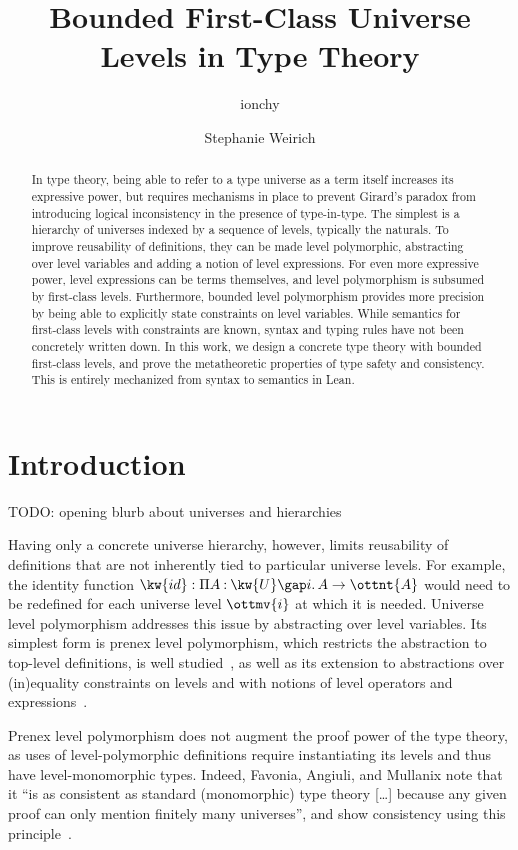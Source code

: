 \documentclass[a4paper,UKenglish,cleveref,autoref,thm-restate]{lipics-v2021}
\title{Bounded First-Class Universe Levels \titlebreak in Type Theory}
\author{ionchy}
  {University of Pennsylvania, Philadelphia, USA}
  {jcxz@seas.upenn.edu}
  {0000-0003-0830-3180}
  {}
\author{Stephanie Weirich}
  {University of Pennsylvania, Philadelphia, USA}
  {sweirich@seas.upenn.edu}
  {0000-0002-6756-9168}
  {}
\newcommand{\citep}[1]{\cite{#1}}
\begin{document}
\maketitle

\begin{abstract}
  In type theory, being able to refer to a type universe as a term itself
  increases its expressive power,
  but requires mechanisms in place to prevent Girard's paradox
  from introducing logical inconsistency in the presence of type-in-type.
  The simplest is a hierarchy of universes indexed by a sequence of levels,
  typically the naturals.
  To improve reusability of definitions,
  they can be made level polymorphic,
  abstracting over level variables and adding a notion of level expressions.
  For even more expressive power,
  level expressions can be terms themselves,
  and level polymorphism is subsumed by first-class levels.
  Furthermore, bounded level polymorphism provides more precision
  by being able to explicitly state constraints on level variables.
  While semantics for first-class levels with constraints are known,
  syntax and typing rules have not been concretely written down.
  In this work, we design a concrete type theory with bounded first-class levels,
  and prove the metatheoretic properties of type safety and consistency.
  This is entirely mechanized from syntax to semantics in Lean.
\end{abstract}

\section{Introduction}

TODO: opening blurb about universes and hierarchies

Having only a concrete universe hierarchy, however,
limits reusability of definitions that are not inherently tied to particular universe levels.
For example, the identity function $\kw{id} :   \Pi  A  \mathbin{:}   \kw{U} \gap  i   \mathpunct{.}  A   \to  \ottnt{A} $
would need to be redefined for each universe level $\ottmv{i}$ at which it is needed.
Universe level polymorphism addresses this issue by abstracting over level variables.
Its simplest form is prenex level polymorphism,
which restricts the abstraction to top-level definitions,
is well studied~\citep{anon-univ,univ-poly-coq},
as well as its extension to abstractions over (in)equality constraints on levels
and with notions of level operators and expressions~\citep{explicit}.

Prenex level polymorphism does not augment the proof power of the type theory,
as uses of level-polymorphic definitions require instantiating its levels
and thus have level-monomorphic types.
Indeed, Favonia, Angiuli, and Mullanix note that it
``is as consistent as standard (monomorphic) type theory [\dots]
because any given proof can only mention finitely many universes'',
and show consistency using this principle~\citep{displacement}.
\end{document}
